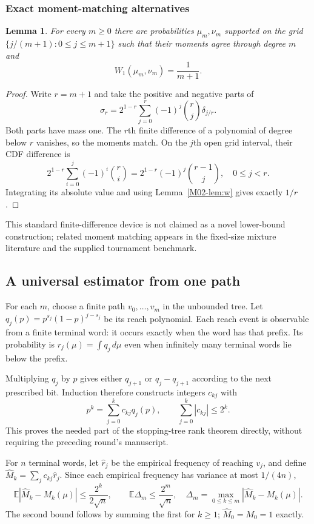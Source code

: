 \documentclass[11pt,a4paper]{article}
\newtheorem{lemma}[theorem]{Lemma}
\theoremstyle{definition}\newtheorem{definition}[theorem]{Definition}
\theoremstyle{remark}\newtheorem{remark}[theorem]{Remark}
\newcommand{\E}{\mathbb E}\newcommand{\one}{\mathbf 1}\newcommand{\1}{\mathbf 1}
\numberwithin{equation}{section}
\begin{document}
\subsubsection{Exact moment-matching alternatives}
\begin{lemma}\label{M02-lem:pair}
For every $m\ge0$ there are probabilities $\mu_m,\nu_m$ supported on the grid $\{j/(m+1):0\le j\le m+1\}$ such that their moments agree through degree $m$ and
\[
 W_1(\mu_m,\nu_m)=\frac1{m+1}.
\]
\end{lemma}
\begin{proof}
Write $r=m+1$ and take the positive and negative parts of
\[
 \sigma_r=2^{1-r}\sum_{j=0}^r(-1)^j\binom{r}{j}\delta_{j/r}.
\]
Both parts have mass one. The $r$th finite difference of a polynomial of degree below $r$ vanishes, so the moments match. On the $j$th open grid interval, their CDF difference is
\[
 2^{1-r}\sum_{i=0}^j(-1)^i\binom{r}{i}
 =2^{1-r}(-1)^j\binom{r-1}{j},\quad 0\le j<r.
\]
Integrating its absolute value and using Lemma~\ref{M02-lem:w} gives exactly $1/r$.
\end{proof}
This standard finite-difference device is not claimed as a novel lower-bound construction; related moment matching appears in the fixed-size mixture literature and the supplied tournament benchmark.

\subsection{A universal estimator from one path}\label{M02-sec-3}
For each $m$, choose a finite path $v_0,\ldots,v_m$ in the unbounded tree. Let $q_j(p)=p^{s_j}(1-p)^{j-s_j}$ be its reach polynomial. Each reach event is observable from a finite terminal word: it occurs exactly when the word has that prefix. Its probability is $r_j(\mu)=\int q_j\,d\mu$ even when infinitely many terminal words lie below the prefix.

Multiplying $q_j$ by $p$ gives either $q_{j+1}$ or $q_j-q_{j+1}$ according to the next prescribed bit. Induction therefore constructs integers $c_{kj}$ with
\[
 p^k=\sum_{j=0}^k c_{kj}q_j(p),\qquad
 \sum_{j=0}^k|c_{kj}|\le2^k.\tag{M02.2}
\]
This proves the needed part of the stopping-tree rank theorem directly, without requiring the preceding round's manuscript.

For $n$ terminal words, let $\widehat r_j$ be the empirical frequency of reaching $v_j$, and define $\widehat M_k=\sum_jc_{kj}\widehat r_j$. Since each empirical frequency has variance at most $1/(4n)$,
\[
 \E|\widehat M_k-M_k(\mu)|\le\frac{2^k}{2\sqrt n},
 \qquad
 \E\Delta_m\le\frac{2^m}{\sqrt n},\quad
 \Delta_m=\max_{0\le k\le m}|\widehat M_k-M_k(\mu)|.\tag{M02.3}
\]
The second bound follows by summing the first for $k\ge1$; $\widehat M_0=M_0=1$ exactly.
\end{document}
